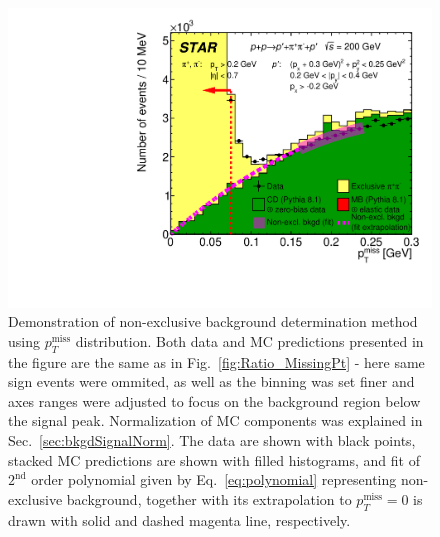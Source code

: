 \begin{figure}[ht!]
\centering%
\parbox{0.4725\textwidth}{%
  \centering%
  \includegraphics[width=\linewidth]{graphics/backgrounds/MissingPt_NonExclBkgdFitDemonstration.pdf}
}%
\quad%
\parbox{0.4725\textwidth}{%
    \caption[Demonstration of non-exclusive background determination method using $p_{T}^{\text{miss}}$ distribution.]{Demonstration of non-exclusive background determination method using $p_{T}^{\text{miss}}$ distribution. Both data and MC predictions presented in the figure are the same as in Fig.~\ref{fig:Ratio_MissingPt} - here same sign events were ommited, as well as the binning was set finer and axes ranges were adjusted to focus on the background region below the signal peak. Normalization of MC components was explained in Sec.~\ref{sec:bkgdSignalNorm}. The data are shown with black points, stacked MC predictions are shown with filled histograms, and fit of $2^{\text{nd}}$ order polynomial given by Eq.~\eqref{eq:polynomial} representing non-exclusive background, together with its extrapolation to $p_{T}^{\text{miss}}=0$ is drawn with solid and dashed magenta line, respectively.}\label{fig:nonExclBkgdDetermination}%
}
\end{figure}


